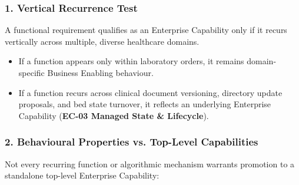 \label{rad:enterprise:40}
\subsubsection*{1. Vertical Recurrence Test}
\label{rad:enterprise:41}

A functional requirement qualifies as an Enterprise Capability only if it recurs vertically across multiple, diverse healthcare domains.

\label{rad:enterprise:42}

\begin{itemize}

\item 
If a function appears only within laboratory orders, it remains domain-specific Business Enabling behaviour.



\item 
If a function recurs across clinical document versioning, directory update proposals, and bed state turnover, it reflects an underlying Enterprise Capability (\textbf{EC-03 Managed State \& Lifecycle}).



\end{itemize}
\label{rad:enterprise:45}
\subsubsection*{2. Behavioural Properties vs. Top-Level Capabilities}
\label{rad:enterprise:46}

Not every recurring function or algorithmic mechanism warrants promotion to a standalone top-level Enterprise Capability:

\label{rad:enterprise:47}

